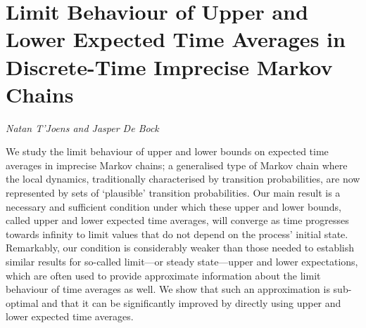\documentclass[../booklet.tex]{subfiles}
\begin{document}
\section[Limit Behaviour of Upper and Lower Expected Time Averages in Discrete-Time Imprecise Markov Chains. {\it Natan T'Joens and Jasper De Bock}]{Limit Behaviour of Upper and Lower Expected Time Averages in Discrete-Time Imprecise Markov Chains}
 

\begin{center}
  {\it Natan T'Joens and Jasper De Bock}
\end{center}

\vskip 0.8cm


We study the limit behaviour of upper and lower bounds on expected time averages in imprecise Markov chains; a generalised type of Markov chain where the local dynamics, traditionally characterised by transition probabilities, are now represented by sets of `plausible' transition probabilities.
Our main result is a necessary and sufficient condition under which these upper and lower bounds, called upper and lower expected time averages, will converge as time progresses towards infinity to limit values that do not depend on the process' initial state.
Remarkably, our condition is considerably weaker than those needed to establish similar results for so-called limit---or steady state---upper and lower expectations, which are often used to provide approximate information about the limit behaviour of time averages as well.
We show that such an approximation is sub-optimal and that it can be significantly improved by directly using upper and lower expected time averages.
\end{document}
